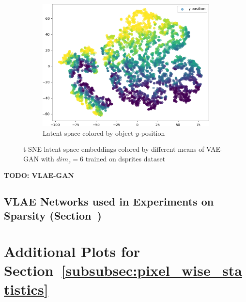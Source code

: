 \documentclass[11pt]{article}
\let\oldsection\section
\renewcommand\section{\clearpage\oldsection}
\begin{document}
\begin{figure}[H]
\begin{subfigure}{.19\textwidth}
\includegraphics[width=\textwidth]{images/latent_spaces/dsprites/vae_gan/embeddings_mu_4.png}
\caption{Latent space colored by object $y$-position}
\end{subfigure}
\caption[\ac{VAE}-\ac{GAN} Latent Space - dsprites]{t-SNE latent space embeddings colored by different means of \ac{VAE}-\ac{GAN} with $dim_z=6$ trained on dsprites dataset}
\label{fig:vae_gan_latent_space_dsprites}
\end{figure}

\textbf{TODO: VLAE-GAN}


\pagebreak
\begin{landscape}
\section{\ac{VLAE} Networks used in Experiments on Sparsity (Section~\label{subsec:effective-network-capacity})}\label{sec:listings_sparsity_networks}

\pagebreak

\pagebreak

\pagebreak

\pagebreak

\pagebreak

\end{landscape}

\pagebreak
\section{Additional Plots for Section~\ref{subsubsec:pixel_wise_statistics}}\label{sec:appendix_pixel_wise_statistics}
\end{document}
